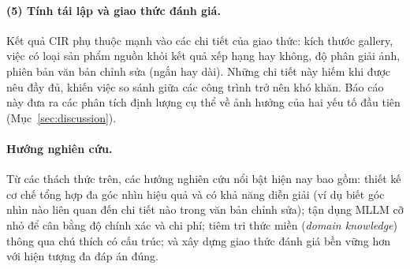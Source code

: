 \paragraph{(5) Tính tái lập và giao thức đánh giá.} Kết quả CIR phụ thuộc mạnh vào các chi tiết của giao thức: kích thước gallery, việc có loại sản phẩm nguồn khỏi kết quả xếp hạng hay không, độ phân giải ảnh, phiên bản văn bản chỉnh sửa (ngắn hay dài). Những chi tiết này hiếm khi được nêu đầy đủ, khiến việc so sánh giữa các công trình trở nên khó khăn. Báo cáo này đưa ra các phân tích định lượng cụ thể về ảnh hưởng của hai yếu tố đầu tiên (Mục~\ref{sec:discussion}).

\paragraph{Hướng nghiên cứu.} Từ các thách thức trên, các hướng nghiên cứu nổi bật hiện nay bao gồm: thiết kế cơ chế tổng hợp đa góc nhìn hiệu quả và có khả năng diễn giải (ví dụ biết góc nhìn nào liên quan đến chi tiết nào trong văn bản chỉnh sửa); tận dụng MLLM cỡ nhỏ để cân bằng độ chính xác và chi phí; tiêm tri thức miền (\emph{domain knowledge}) thông qua chú thích có cấu trúc; và xây dựng giao thức đánh giá bền vững hơn với hiện tượng đa đáp án đúng.
